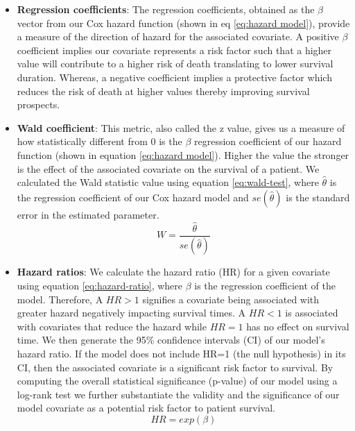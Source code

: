 \documentclass{l4proj}
\begin{document}
\begin{itemize}
    \item \textbf{Regression coefficients}: The regression coefficients, obtained as the \(\beta\) vector from our Cox hazard function (shown in eq \ref{eq:hazard model}), provide a measure of the direction of hazard for the associated covariate. A positive \(\beta\) coefficient implies our covariate represents a risk factor such that a higher value will contribute to a higher risk of death translating to lower survival duration. Whereas, a negative coefficient implies a protective factor which reduces the risk of death at higher values thereby improving survival prospects. 
    
    \item \textbf{Wald coefficient}: This metric, also called the z value, gives us a measure of how statistically different from 0 is the \(\beta\) regression coefficient of our hazard function (shown in equation \ref{eq:hazard model}). Higher the value the stronger is the effect of the associated covariate on the survival of a patient. We calculated the Wald statistic value using equation \ref{eq:wald-test}, where \(\hat{\theta}\) is the regression coefficient of our Cox hazard model and \(se(\hat{\theta})\) is the standard error in the estimated parameter. 
    \begin{equation} \label{eq:wald-test}
        W = \frac{\hat{\theta}}{se(\hat{\theta})}
    \end{equation}
    
    \item \textbf{Hazard ratios}: We calculate the hazard ratio (HR) for a given covariate using equation \ref{eq:hazard-ratio}, where \(\beta\) is the regression coefficient of the model. Therefore, A $HR > 1$ signifies a covariate being associated with greater hazard negatively impacting survival times. A $HR < 1$ is associated with covariates that reduce the hazard while $HR = 1$ has no effect on survival time. We then generate the 95\% confidence intervals (CI) of our model's hazard ratio. If the model does not include HR=1 (the null hypothesis) in its CI, then the associated covariate is a significant risk factor to survival. By computing the overall statistical significance (p-value) of our model using a log-rank test we further substantiate the validity and the significance of our model covariate as a potential risk factor to patient survival. 
    \begin{equation}\label{eq:hazard-ratio}
        HR = exp(\beta)
    \end{equation}

\end{itemize}
\end{document}
